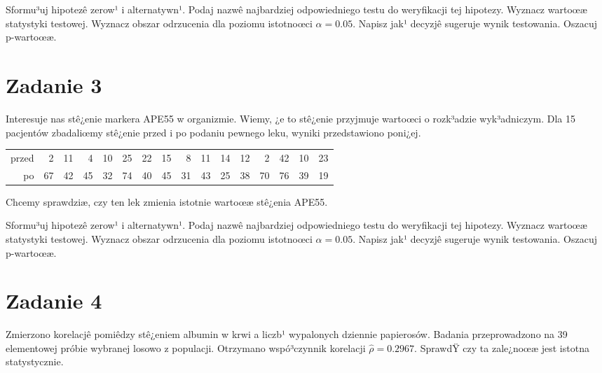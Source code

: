 \documentclass[a4paper,12pt]{article}
\begin{document}
  Sformu³uj hipotezê zerow¹ i alternatywn¹. 
  Podaj nazwê najbardziej odpowiedniego testu do weryfikacji tej hipotezy. 
  Wyznacz wartoœæ statystyki testowej. 
  Wyznacz obszar odrzucenia dla poziomu istotnoœci $\alpha=0.05$. 
  Napisz jak¹ decyzjê sugeruje wynik testowania. Oszacuj p-wartoœæ. \vspace{1cm} 

  \section*{Zadanie 3}
     
  Interesuje nas stê¿enie markera APE55  w organizmie. 
  Wiemy, ¿e to stê¿enie przyjmuje wartoœci o rozk³adzie wyk³adniczym. 
  Dla 15 pacjentów zbadaliœmy stê¿enie przed i po podaniu pewnego leku, 
  wyniki przedstawiono poni¿ej.
  
  \vspace{0.5cm} 
  \noindent\begin{center} 
\begin{tabular}{rrrrrrrrrrrrrrrr}
  \hline
  \hline
przed & 2 & 11 & 4 & 10 & 25 & 22 & 15 & 8 & 11 & 14 & 12 & 2 & 42 & 10 & 23 \\
  po & 67 & 42 & 45 & 32 & 74 & 40 & 45 & 31 & 43 & 25 & 38 & 70 & 76 & 39 & 19 \\
   \hline
\end{tabular}
 
  \end{center} 
  \vspace{0.5cm}
  
  Chcemy sprawdziæ, czy ten lek zmienia istotnie wartoœæ stê¿enia APE55.
  
  Sformu³uj hipotezê zerow¹ i alternatywn¹. 
  Podaj nazwê najbardziej odpowiedniego testu do weryfikacji tej hipotezy. 
  Wyznacz wartoœæ statystyki testowej. 
  Wyznacz obszar odrzucenia dla poziomu istotnoœci $\alpha=0.05$. 
  Napisz jak¹ decyzjê sugeruje wynik testowania. Oszacuj p-wartoœæ. \vspace{1cm} 

  \section*{Zadanie 4}
     
     Zmierzono korelacjê pomiêdzy stê¿eniem albumin w krwi a liczb¹ wypalonych dziennie papierosów. 
     Badania przeprowadzono na 39 elementowej próbie wybranej losowo z populacji. 
     Otrzymano wspó³czynnik korelacji $\hat\rho = 0.2967 $. 
     SprawdŸ czy ta zale¿noœæ jest istotna statystycznie. 
     
\end{document}

